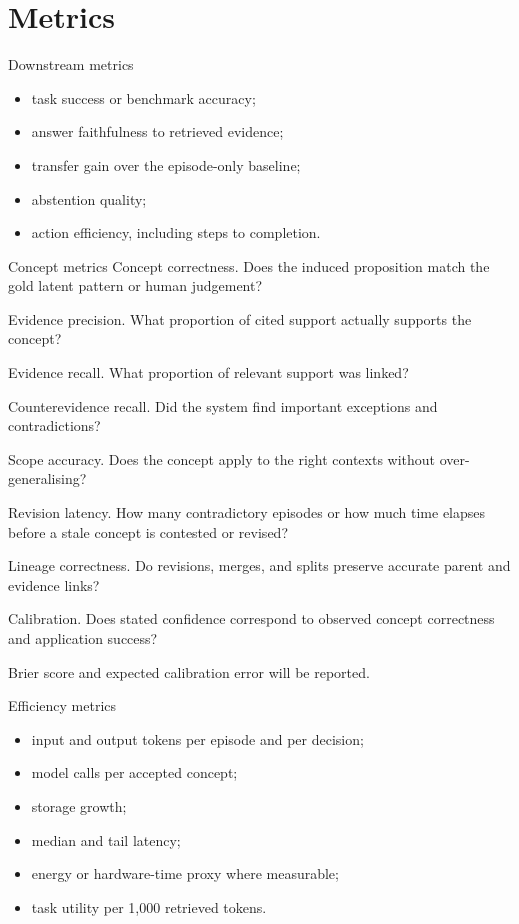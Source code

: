 \documentclass[
  english,
  a4paper,
  DIV=11,
  numbers=noendperiod]{scrreprt}
\providecommand{\tightlist}{%
  \setlength{\itemsep}{0pt}\setlength{\parskip}{0pt}}
\begin{document}
\section{Metrics}\label{metrics}

Downstream metrics

\begin{itemize}
\tightlist
\item
  task success or benchmark accuracy;
\item
  answer faithfulness to retrieved evidence;
\item
  transfer gain over the episode-only baseline;
\item
  abstention quality;
\item
  action efficiency, including steps to completion.
\end{itemize}

Concept metrics Concept correctness. Does the induced proposition match
the gold latent pattern or human judgement?

Evidence precision. What proportion of cited support actually supports
the concept?

Evidence recall. What proportion of relevant support was linked?

Counterevidence recall. Did the system find important exceptions and
contradictions?

Scope accuracy. Does the concept apply to the right contexts without
over-generalising?

Revision latency. How many contradictory episodes or how much time
elapses before a stale concept is contested or revised?

Lineage correctness. Do revisions, merges, and splits preserve accurate
parent and evidence links?

Calibration. Does stated confidence correspond to observed concept
correctness and application success?

Brier score and expected calibration error will be reported.

Efficiency metrics

\begin{itemize}
\tightlist
\item
  input and output tokens per episode and per decision;
\item
  model calls per accepted concept;
\item
  storage growth;
\item
  median and tail latency;
\item
  energy or hardware-time proxy where measurable;
\item
  task utility per 1,000 retrieved tokens.
\end{itemize}
\end{document}
